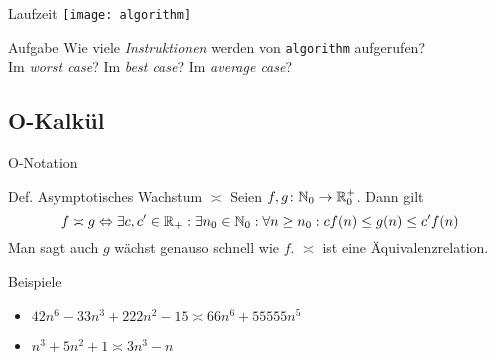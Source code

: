 \begin{frame}{Laufzeit}
\centering\texttt{[image: algorithm]}

\begin{exampleblock}{Aufgabe}
	Wie viele \emph{Instruktionen} werden von \texttt{algorithm} aufgerufen? \\%
	\pause
	Im \emph{worst case}? Im \emph{best case}? Im \emph{average case}?
\end{exampleblock}
\end{frame}

\subsection{O-Kalkül}
\begin{frame}{O-Notation}
	\begin{block}{Def. Asymptotisches Wachstum $\asymp$}
		Seien $f,g \colon \mathbb{N}_0 \to \mathbb{R}^+_0$. Dann gilt
		\[
			f \asymp g \Leftrightarrow \exists c,c'\in \mathbb{R}_+: \exists n_0\in \mathbb{N}_0: \forall n\geq n_0: c f(n) \leq g(n) \leq c' f(n)
		\]
		Man sagt auch $g$ wächst genauso schnell wie $f$. $\asymp$ ist eine Äquivalenzrelation.
	\end{block}

	\begin{exampleblock}{Beispiele}
		\begin{itemize}
			\item $42n^6-33n^3+222n^2 -15 \asymp 66n^6+55555n^5$
			\item $n^{3}+5n^2 + 1\asymp 3n^3-n$
		\end{itemize}
	\end{exampleblock}
\end{frame}

